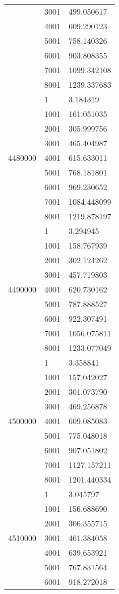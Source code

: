 \begin{table}[htb!]
\begin{tabular}{lll}
 & 3001 & 499.050617 \\
 & 4001 & 609.290123 \\
 & 5001 & 758.140326 \\
 & 6001 & 903.808355 \\
 & 7001 & 1099.342108 \\
 & 8001 & 1239.337683 \\
\multirow[c]{9}{*}{4480000} & 1 & 3.184319 \\
 & 1001 & 161.051035 \\
 & 2001 & 305.999756 \\
 & 3001 & 465.404987 \\
 & 4001 & 615.633011 \\
 & 5001 & 768.181801 \\
 & 6001 & 969.230652 \\
 & 7001 & 1084.448099 \\
 & 8001 & 1219.878197 \\
\multirow[c]{9}{*}{4490000} & 1 & 3.294945 \\
 & 1001 & 158.767939 \\
 & 2001 & 302.124262 \\
 & 3001 & 457.719803 \\
 & 4001 & 620.730162 \\
 & 5001 & 787.888527 \\
 & 6001 & 922.307491 \\
 & 7001 & 1056.075811 \\
 & 8001 & 1233.077049 \\
\multirow[c]{9}{*}{4500000} & 1 & 3.358841 \\
 & 1001 & 157.042027 \\
 & 2001 & 301.073790 \\
 & 3001 & 469.256878 \\
 & 4001 & 609.085083 \\
 & 5001 & 775.048018 \\
 & 6001 & 907.051802 \\
 & 7001 & 1127.157211 \\
 & 8001 & 1201.440334 \\
\multirow[c]{9}{*}{4510000} & 1 & 3.045797 \\
 & 1001 & 156.688690 \\
 & 2001 & 306.355715 \\
 & 3001 & 461.384058 \\
 & 4001 & 639.653921 \\
 & 5001 & 767.831564 \\
 & 6001 & 918.272018 \\

\end{tabular}
\end{table}
